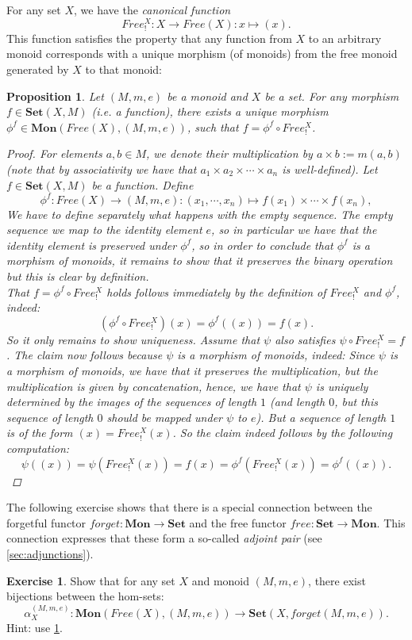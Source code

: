 \documentclass[a4paper,11pt, oneside,titlepage=false]{scrbook}
\theoremstyle{plain}
\newtheorem{prop}[thm]{Proposition}
\theoremstyle{definition}
\newtheorem{exer}[thm]{Exercise}
\newcommand{\Catb}[1]{\mathbf{#1}}
\newcommand{\SET}{\Catb{Set}}
\newcommand{\MON}{\Catb{Mon}}
\newcommand{\CHom}[3]{{#1}(#2,#3)}
\newcommand{\co}[2]{\ensuremath{#2 \circ #1}}
\begin{document}
For any set $X$, we have the \textit{canonical function}
\[
Free^{X}_{!}: X\to Free(X): x\mapsto (x).
\]
This function satisfies the property that any function from $X$ to an arbitrary monoid corresponds with a unique morphism (of monoids) from the free monoid generated by $X$ to that monoid:
\begin{prop}\label{prop:UVP_forget_montoset} Let $(M,m,e)$ be a monoid and $X$ be a set. For any morphism $f \in \CHom{\SET}{X}{M}$ (i.e. a function), there exists a unique  morphism $\phi^{f} \in \CHom{\MON}{Free(X)}{(M,m,e)}$, such that $f = \co{Free^{X}_{!}}{\phi^{f}}$.
\begin{proof}
For elements $a,b\in M$, we denote their multiplication by $a\times b := m(a,b)$ (note that by associativity we have that $a_1\times a_2\times\cdots\times a_n$ is well-defined). Let $f\in \CHom{\SET}{X}{M}$ be a function. Define
\[
\phi^{f}: Free(X)\to (M,m,e): (x_1,\cdots,x_n)\mapsto f(x_1) \times\cdots \times f(x_n),
\]
We have to define separately what happens with the empty sequence. The empty sequence we map to the identity element $e$, so in particular we have that the identity element is preserved under $\phi^{f}$, so in order to conclude that $\phi^{f}$ is a morphism of monoids, it remains to show that it preserves the binary operation but this is clear by definition.\\
That $f = \co{Free^{X}_{!}}{\phi^{f}}$ holds follows immediately by the definition of $Free^{X}_{!}$ and $\phi^{f}$, indeed:
\[
\left(\co{Free^{X}_{!}}{\phi^{f}}\right)(x) = \phi^{f}\left((x)\right) = f(x).
\]
So it only remains to show uniqueness. Assume that $\psi$ also satisfies $\co{Free^{X}_{!}}{\psi} = f$. The claim now follows because $\psi$ is a morphism of monoids, indeed: Since $\psi$ is a morphism of monoids, we have that it preserves the multiplication, but the multiplication is given by concatenation, hence, we have that $\psi$ is uniquely determined by the images of the sequences of length $1$ (and length $0$, but this sequence of length $0$ should be mapped under $\psi$ to $e$). But a sequence of length $1$ is of the form $(x) = Free^{X}_{!}(x)$. So the claim indeed follows by the following computation:
\[
\psi((x)) = \psi(Free^{X}_{!}(x)) = f(x) = \phi^{f}(Free^{X}_{!}(x)) = \phi^{f}((x)).
\]
\end{proof}
\end{prop}

The following exercise shows that there is a special connection between the forgetful functor $\mathit{forget}: \MON\to\SET$ and the free functor $\mathit{free}: \SET\to\MON$. This connection expresses that these form a so-called \textit{adjoint pair} (see \cref{sec:adjunctions}).
\begin{exer}\label{exer:preadjunction_monset}
Show that for any set $X$ and monoid $(M,m,e)$, there exist bijections between the hom-sets:
\[
\alpha_{X}^{(M,m,e)} : \CHom{\MON}{Free(X)}{(M,m,e)} \to \CHom{\SET}{X}{forget(M,m,e)}.
\]
Hint: use \cref{prop:UVP_forget_montoset}.
\end{exer}
\end{document}
